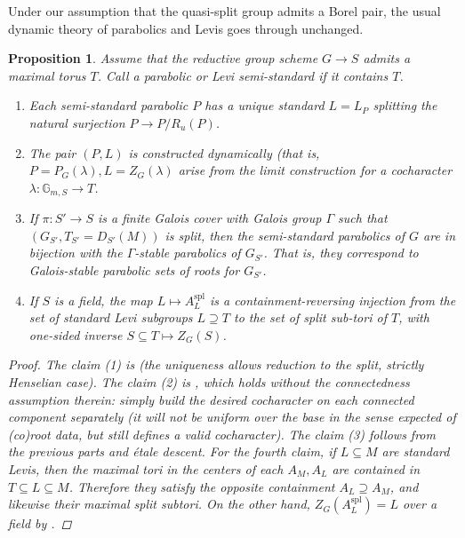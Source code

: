 \documentclass[openany]{amsbook}
\newtheorem{proposition}[theorem]{Proposition}
\theoremstyle{definition}
\theoremstyle{remark}
\numberwithin{equation}{section}
\newcommand{\G}{\mathbb{G}}
\renewcommand{\-}{\operatorname{-}}
\newcommand{\spl}{\mathrm{spl}}
\begin{document}
Under our assumption that the quasi-split group admits a Borel pair, the usual dynamic theory of parabolics and Levis goes through unchanged.
\begin{proposition}\label{prop.parab.levi.basics}
    Assume that the reductive group scheme $G \to S$ admits a maximal torus $T$. Call a parabolic or Levi \textit{semi-standard} if it contains $T$.
    \begin{enumerate}
        \item Each semi-standard parabolic $P$ has a unique standard $L = L_P$ splitting the natural surjection $P \to P/R_u(P)$. 
        \item The pair $(P, L)$ is constructed dynamically (that is, $P = P_G(\lambda), L = Z_G(\lambda)$ arise from the limit construction for a cocharacter $\lambda : \G_{m, S} \to T$.
        \item If $\pi : S' \to S$ is a finite Galois cover with Galois group $\Gamma$ such that $(G_{S'}, T_{S'} = D_{S'}(M))$ is split, then the semi-standard parabolics of $G$ are in bijection with the $\Gamma$-stable parabolics of $G_{S'}$. That is, they correspond to Galois-stable parabolic sets of roots for $G_{S'}$.
        \item If $S$ is a field, the map $L \mapsto A_L^{\spl}$ is a containment-reversing injection from the set of standard Levi subgroups $L \supseteq T$ to the set of split sub-tori of $T$, with one-sided inverse $S \subseteq T \mapsto Z_G(S)$.
    \end{enumerate}
    \begin{proof}
        The claim (1) is \cite[Prop. 5.4.5]{conradrgs} (the uniqueness allows reduction to the split, strictly Henselian case). The claim (2) is \cite[Thm. 7.3.1.(1)]{gillergs}, which holds without the connectedness assumption therein: simply build the desired cocharacter on each connected component separately (it will not be uniform over the base in the sense expected of (co)root data, but still defines a valid cocharacter). The claim (3) follows from the previous parts and \'etale descent. For the fourth claim, if $L \subseteq M$ are standard Levis, then the maximal tori in the centers of each $A_M, A_L$ are contained in $T \subseteq L \subseteq M$. Therefore they satisfy the opposite containment $A_L \supseteq A_M$, and likewise their maximal split subtori. On the other hand, $Z_G(A_L^{\spl}) = L$ over a field by \cite[Thm. 4.15]{BorelTits}. 
    \end{proof}
\end{proposition}
\end{document}
